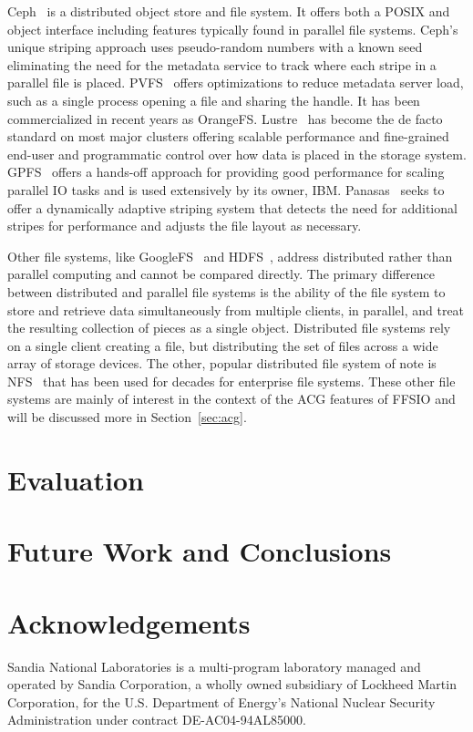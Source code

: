 \documentclass{sig-alt-gov2}
\begin{document}
Ceph~\cite{weil:ceph} is a distributed object store and file system. It offers
both a POSIX and object interface including features typically found in parallel
file systems.
Ceph's unique striping approach uses pseudo-random numbers with a
known seed eliminating the need for the metadata service to track where each
stripe in a parallel file is placed.
PVFS~\cite{carns:pvfs} offers optimizations to reduce metadata server load,
such as a single process opening a file and sharing the handle.
It has been
commercialized in recent years as OrangeFS.
Lustre~\cite{braam:lustre-arch} has become the de facto standard on most major
clusters offering scalable performance and fine-grained end-user and
programmatic control over how data is placed in the storage system.
GPFS~\cite{schmuck:gpfs} offers a hands-off approach for providing good
performance for scaling parallel IO tasks and is used extensively by its owner,
IBM.
Panasas~\cite{panasas:architecture} seeks to offer a dynamically adaptive
striping system that detects the need for additional stripes for performance
and adjusts the file layout as necessary.

Other file systems, like GoogleFS~\cite{ghemawat:googlefs} and
HDFS~\cite{Shvachko:2010:hdfs}, address distributed rather than parallel
computing and cannot be compared directly.
The primary difference between
distributed and parallel file systems is the ability of the file system to
store and retrieve data simultaneously from multiple clients, in parallel, and
treat the resulting collection of pieces as a single object.  Distributed file
systems rely on a single client creating a file, but distributing the set of
files across a wide array of storage devices.
The other, popular distributed
file system of note is NFS~\cite{powlowski:1994:nfs3} that has been used for
decades for enterprise file systems.
These other file systems are mainly of
interest in the context of the ACG features of FFSIO and will be discussed more
in Section~\ref{sec:acg}.

\section{Evaluation}
\label{performance}


\section{Future Work and Conclusions}
\label{future}


\section{Acknowledgements}

Sandia National Laboratories is a multi-program laboratory managed and operated
by Sandia Corporation, a wholly owned subsidiary of Lockheed Martin
Corporation, for the U.S. Department of Energy's National Nuclear Security
Administration under contract DE-AC04-94AL85000.




\vfill\eject
\end{document}
